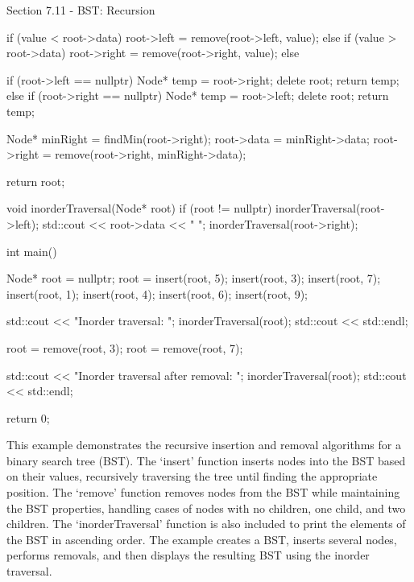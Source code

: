 \begin{notes}{Section 7.11 - BST: Recursion}
\begin{highlight}
\begin{code}[C++]
{        if (value < root->data) {
            root->left = remove(root->left, value);
        } else if (value > root->data) {
            root->right = remove(root->right, value);
        } else {
            if (root->left == nullptr) {
                Node* temp = root->right;
                delete root;
                return temp;
            } else if (root->right == nullptr) {
                Node* temp = root->left;
                delete root;
                return temp;
            }
    
            Node* minRight = findMin(root->right);
            root->data = minRight->data;
            root->right = remove(root->right, minRight->data);
        }
    
        return root;
    }
    
    void inorderTraversal(Node* root) {
        if (root != nullptr) {
            inorderTraversal(root->left);
            std::cout << root->data << " ";
            inorderTraversal(root->right);
        }
    }
    
    int main() {
        Node* root = nullptr;
        root = insert(root, 5);
        insert(root, 3);
        insert(root, 7);
        insert(root, 1);
        insert(root, 4);
        insert(root, 6);
        insert(root, 9);
    
        std::cout << "Inorder traversal: ";
        inorderTraversal(root);
        std::cout << std::endl;
    
        root = remove(root, 3);
        root = remove(root, 7);
    
        std::cout << "Inorder traversal after removal: ";
        inorderTraversal(root);
        std::cout << std::endl;
    
        return 0;
    }
    \end{code}
        This example demonstrates the recursive insertion and removal algorithms for a binary search tree (BST). The `insert' function inserts nodes into the BST based on their values, recursively traversing the tree until finding the appropriate position. The `remove' function removes nodes from the BST while maintaining the BST 
        properties, handling cases of nodes with no children, one child, and two children. The `inorderTraversal' function is also included to print the elements of the BST in ascending order. The example creates a BST, inserts several nodes, performs removals, and then displays the resulting BST using the inorder traversal.
    \end{highlight}
\end{notes}

